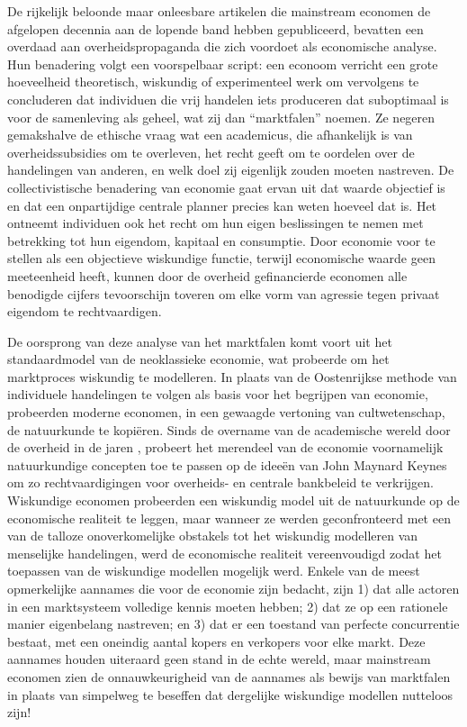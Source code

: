 De rijkelijk beloonde maar onleesbare artikelen die mainstream economen de afgelopen decennia aan de lopende band hebben gepubliceerd, bevatten een overdaad aan overheidspropaganda die zich voordoet als economische analyse. Hun benadering volgt een voorspelbaar script: een econoom verricht een grote hoeveelheid theoretisch, wiskundig of experimenteel werk om vervolgens te concluderen dat individuen die vrij handelen iets produceren dat suboptimaal is voor de samenleving als geheel, wat zij dan ``marktfalen'' noemen. Ze negeren gemakshalve de ethische vraag wat een academicus, die afhankelijk is van overheidssubsidies om te overleven, het recht geeft om te oordelen over de handelingen van anderen, en welk doel zij eigenlijk zouden moeten nastreven. De collectivistische benadering van economie gaat ervan uit dat waarde objectief is en dat een onpartijdige centrale planner precies kan weten hoeveel dat is. Het ontneemt individuen ook het recht om hun eigen beslissingen te nemen met betrekking tot hun eigendom, kapitaal en consumptie. Door economie voor te stellen als een objectieve wiskundige functie, terwijl economische waarde geen meeteenheid heeft, kunnen door de overheid gefinancierde economen alle benodigde cijfers tevoorschijn toveren om elke vorm van agressie tegen privaat eigendom te rechtvaardigen.

De oorsprong van deze analyse van het marktfalen komt voort uit het standaardmodel van de neoklassieke economie, wat probeerde om het marktproces wiskundig te modelleren. In plaats van de Oostenrijkse methode van individuele handelingen te volgen als basis voor het begrijpen van economie, probeerden moderne economen, in een gewaagde vertoning van cultwetenschap, de natuurkunde te kopiëren. Sinds de overname van de academische wereld door de overheid in de jaren , probeert het merendeel van de economie voornamelijk natuurkundige concepten toe te passen op de ideeën van John Maynard Keynes om zo rechtvaardigingen voor overheids- en centrale bankbeleid te verkrijgen. Wiskundige economen probeerden een wiskundig model uit de natuurkunde op de economische realiteit te leggen, maar wanneer ze werden geconfronteerd met een van de talloze onoverkomelijke obstakels tot het wiskundig modelleren van menselijke handelingen, werd de economische realiteit vereenvoudigd zodat het toepassen van de wiskundige modellen mogelijk werd. Enkele van de meest opmerkelijke aannames die voor de economie zijn bedacht, zijn 1) dat alle actoren in een marktsysteem volledige kennis moeten hebben; 2) dat ze op een rationele manier eigenbelang nastreven; en 3) dat er een toestand van perfecte concurrentie bestaat, met een oneindig aantal kopers en verkopers voor elke markt. Deze aannames houden uiteraard geen stand in de echte wereld, maar mainstream economen zien de onnauwkeurigheid van de aannames als bewijs van marktfalen in plaats van simpelweg te beseffen dat dergelijke wiskundige modellen nutteloos zijn!

